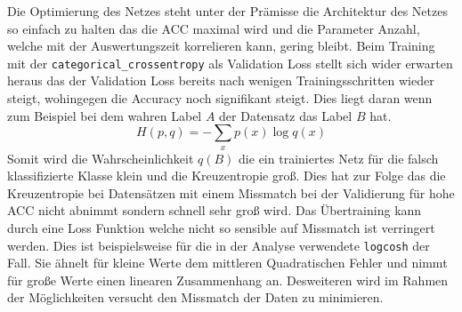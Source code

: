 Die Optimierung des Netzes steht unter der Prämisse die Architektur des Netzes
so einfach zu halten das die ACC maximal wird und die Parameter Anzahl, welche 
mit der Auswertungszeit korrelieren kann, gering bleibt. 
Beim Training mit der \texttt{categorical\_crossentropy} als Validation Loss stellt sich 
wider erwarten heraus das der Validation Loss bereits nach wenigen
Trainingsschritten wieder steigt, wohingegen die Accuracy noch 
signifikant steigt.
Dies liegt daran wenn zum Beispiel bei dem wahren Label $A$ der 
Datensatz das Label $B$ hat. 
\begin{equation}
		H(p,q) = -\sum_x p(x) \log q(x)
\end{equation}
Somit wird die Wahrscheinlichkeit $q(B)$ die ein trainiertes Netz für die 
falsch klassifizierte Klasse klein und die Kreuzentropie groß.
Dies hat zur Folge das die Kreuzentropie bei Datensätzen mit einem Missmatch
bei der Validierung für hohe ACC nicht abnimmt sondern schnell sehr groß wird.
Das Übertraining kann durch eine Loss Funktion welche nicht so sensible auf
Missmatch ist verringert werden. 
Dies ist beispielsweise für die in der Analyse verwendete \texttt{logcosh} der
Fall. 
Sie ähnelt für kleine Werte dem mittleren Quadratischen Fehler und nimmt für
große Werte einen linearen Zusammenhang an.
Desweiteren wird im Rahmen der Möglichkeiten versucht den Missmatch der Daten 
zu minimieren.

